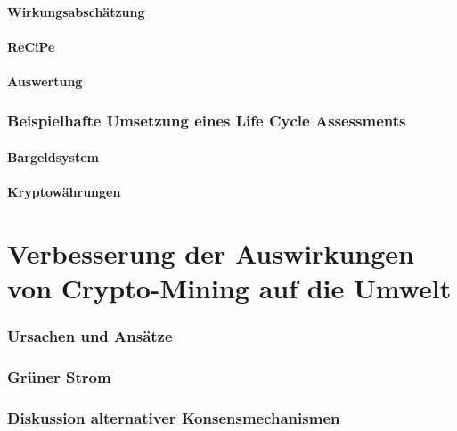 \documentclass[12pt]{article}
\begin{document}
\subsection{Wirkungsabschätzung}


\subsection{ReCiPe}


\subsection{Auswertung}


\section{Beispielhafte Umsetzung eines Life Cycle Assessments}

\subsection{Bargeldsystem}

\subsection{Kryptowährungen}


\part{Verbesserung der Auswirkungen von Crypto-Mining auf die Umwelt}
\section{Ursachen und Ansätze}


\section{Grüner Strom}


\section{Diskussion alternativer Konsensmechanismen}

\end{document}
